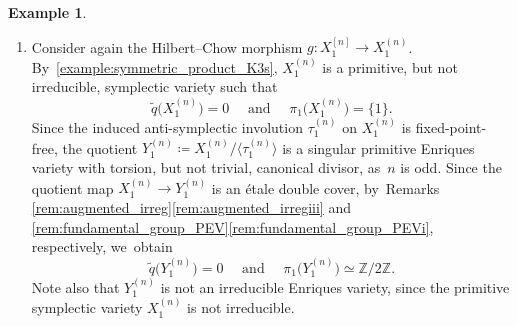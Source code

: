 \documentclass[JEP,XML,SOM,Unicode,published]{cedram}
\newenvironment{enumeratea}
{\bgroup\def\theenumi{\alph{enumi}}\begin{enumerate}}
{\end{enumerate}\egroup}
\renewcommand\theenumi{\roman{enumi}}
\let\ts\textstyle
\theoremstyle{plain}
\theoremstyle{definition}
\newtheorem{exa}[thm]{Example}
\newcommand{\Z}{\mathbb{Z}}
\newcommand{\R}{\mathbb{R}}
\DeclareMathOperator{\NEb}{\overline{\mathrm{NE}}}
\begin{document}
\begin{exa}
\begin{enumeratea}
Consider now two $(-2)$-curves $E_{i_1}$ and $D_{i_1}$ on $X_1$ and the corresponding two Lagrangian submanifolds $E_{i_1}^{[n]}\simeq \mathbb{P}^n$ and $D_{i_1}^{[n]}\simeq \mathbb{P}^n$ of $X_1^{[n]}$, respectively.
Let $l$ be a line in $E_{i_1}^{[n]}$ and let $l'$ be the image of $l$ under $\tau_1^{[n]}$ in $D_{i_1}^{[n]}$. Then $R=\R_{\geq 0}(\ell+\ell')$ is an extremal ray of $\NEb \bigl(X_1^{[n]} \bigr)^{\langle \tau_1^{[n]} \rangle}$, where $\ell$ and $\ell'$ denote the classes of the lines $l \subset E_{i_1}^{[n]}$ and $l' \subset D_{i_1}^{[n]}$, respectively.
Let $\theta \colon X_1^{[n]} \to Z$ be the $\langle \tau_1^{[n]}\rangle$-equivariant flopping contraction of $R$. Let $A$ be an integral ample divisor on $Z$, let $H$ be an integral ample divisor on $X_1^{[n]}$, and consider the divisor $D \coloneqq \theta^*(A)-\varepsilon \bigl(H+\tau_1^{[n]}(H) \bigr)$ on $X_1^{[n]}$, where $0< \varepsilon \ll 1$. We~may assume that the $\langle \tau_1^{[n]} \rangle$-pair $\bigl(X_1^{[n]},D \bigr)$ is klt and perform the $\langle \tau_1^{[n]} \rangle$-equivariant $(K_{X_1^{[n]}}+D)$-flip of $R$, which is also a composition of algebraic elementary Mukai flops:
\[
\begin{tikzcd}
X_1^{[n]} \arrow[rr, dashed, "\ts \varphi"] \arrow[dr, "\ts \theta" swap] && X' \arrow[dl, "\ts \theta'"] \\
& Z
\end{tikzcd}
\]
By \autoref{prop:Mukai_flop_EM}, see also the proof of \cite[Prop.\,4.2]{OS11b}, we~know that $X'$ is a projective IHS manifold and that the induced $\langle \tau_1^{[n]} \rangle$-action on $X'$ remains free, so~the quotient $Y' \coloneqq X'/ \langle \tau_1^{[n]} \rangle$ is an Enriques manifold of dimension $2n$ and index $d=2$.

\item\label{example:PEV_from_Cataneseb}
Consider again the Hilbert--Chow morphism
$ g \colon X_1^{[n]} \to X_1^{(n)} $. By~\autoref{example:symmetric_product_K3s}, $X_1^{(n)}$ is a primitive, but not irreducible, symplectic variety such that
\[
\widetilde{q} \bigl(X_1^{(n)} \bigr) = 0 \quad \text{ and } \quad \pi_1 \bigl(X_1^{(n)} \bigr) = \{ 1 \}.
\]
Since the induced anti-symplectic involution $\tau_1^{(n)}$ on $X_1^{(n)}$ is fixed-point-free, the quotient $Y_1^{(n)} \coloneqq X_1^{(n)} / \langle \tau_1^{(n)} \rangle$ is a singular primitive Enriques variety with torsion, but not trivial, canonical divisor, as~$n$ is odd. Since the quotient map
$X_1^{(n)} \to Y_1^{(n)}$
is an étale double cover, by~Remarks \ref{rem:augmented_irreg}\eqref{rem:augmented_irregiii} and \ref{rem:fundamental_group_PEV}\eqref{rem:fundamental_group_PEVi}, respectively, we~obtain
\[
\widetilde{q} \bigl(Y_1^{(n)} \bigr) = 0 \quad \text{ and } \quad \pi_1 \bigl(Y_1^{(n)} \bigr) \simeq \Z / 2\Z.
\]
Note also that $Y_1^{(n)}$ is not an irreducible Enriques variety, since the primitive symplectic variety $X_1^{(n)}$ is not irreducible.


\end{enumeratea}
\end{exa}
\end{document}

